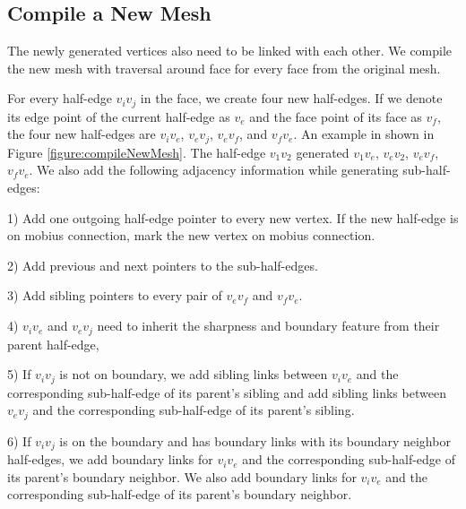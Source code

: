 \documentclass[12pt]{article}
\begin{document}
\subsection{Compile a New Mesh}
The newly generated vertices also need to be linked with each other. We compile the new mesh with traversal around face for every face from the original mesh.

For every half-edge $v_iv_j$ in the face, we create four new half-edges. If we denote its edge point of the current half-edge as $v_e$ and the face point of its face as $v_f$, the four new half-edges are $v_iv_e$, $v_ev_j$, $v_ev_f$, and $v_fv_e$. An example in shown in Figure \ref{figure:compileNewMesh}. The half-edge $v_1v_2$ generated $v_1v_e$, $v_ev_2$, $v_ev_f$, $v_fv_e$. We also add the following adjacency information while generating sub-half-edges: 

1) Add one outgoing half-edge pointer to every new vertex. If the new half-edge is on mobius connection, mark the new vertex on mobius connection.

2) Add previous and next pointers to the sub-half-edges. 

3) Add sibling pointers to every pair of $v_ev_f$ and $v_fv_e$.

4) $v_iv_e$ and $v_ev_j$ need to inherit the sharpness and boundary feature from their parent half-edge, 

5) If $v_iv_j$ is not on boundary, we add sibling links between $v_iv_e$ and the corresponding sub-half-edge of its parent's sibling and add sibling links between $v_ev_j$ and the corresponding sub-half-edge of its parent's sibling.

6) If $v_iv_j$ is on the boundary and has boundary links with its boundary neighbor half-edges, we add boundary links for $v_iv_e$ and the corresponding sub-half-edge of its parent's boundary neighbor. We also add boundary links for $v_iv_e$ and the corresponding sub-half-edge of its parent's boundary neighbor.
\end{document}
